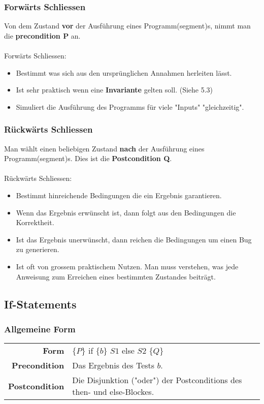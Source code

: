 \documentclass[12pt,a4paper]{article}
\begin{document}
\subsubsection{Forwärts Schliessen}
Von dem Zustand \textbf{vor} der Ausführung eines Programm(segment)s, nimmt man die \textbf{precondition P} an.\\\\
Forwärts Schliessen:
\begin{itemize}
\item Bestimmt was sich aus den ursprünglichen Annahmen herleiten lässt.
\item Ist sehr praktisch wenn eine \textbf{Invariante} gelten soll. (Siehe 5.3) %
\item Simuliert die Ausführung des Programms für viele "Inputs" "gleichzeitig".
\end{itemize}
\newpage
\subsubsection{Rückwärts Schliessen}
Man wählt einen beliebigen Zustand \textbf{nach} der Ausführung eines Programm(segment)s. Dies ist die \textbf{Postcondition Q}.\\\\
Rückwärts Schliessen:
\begin{itemize}
\item Bestimmt hinreichende Bedingungen die ein Ergebnis garantieren.
\item Wenn das Ergebnis erwünscht ist, dann folgt aus den Bedingungen die Korrektheit.
\item Ist das Ergebnis unerwünscht, dann reichen die Bedingungen um einen Bug zu generieren.
\item Ist oft von grossem praktischem Nutzen. Man muss verstehen, was jede Anweisung zum Erreichen eines bestimmten Zustandes beiträgt.
\end{itemize}
\subsection{If-Statements}
\subsubsection{Allgemeine Form}
\begin{tabularx}{\linewidth}{r X}
\textbf{Form} & $\{P\}$ if $\{b\}$ $S1$ else $S2$ $\{Q\}$\\
\textbf{Precondition} & Das Ergebnis des Tests $b$.\\
\textbf{Postcondition} & Die Disjunktion ("oder") der Postconditions des then- und else-Blockes.
\end{tabularx}
\end{document}
